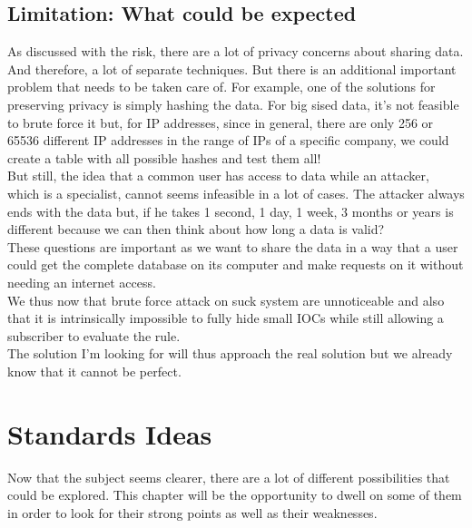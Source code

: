 \documentclass{eplmastersthesis}
\begin{document}
\section{Limitation: What could be expected}

As discussed with the risk, there are a lot of privacy concerns about sharing data. And therefore, a lot of separate techniques. But there is an additional important problem that needs to be taken care of. For example, one of the solutions for preserving privacy is simply hashing the data. For big sised data, it's not feasible to brute force it but, for IP addresses, since in general, there are only 256 or 65536 different IP addresses in the range of IPs of a specific company, we could create a table with all possible hashes and test them all!\\

But still, the idea that a common user has access to data while an attacker, which is a specialist, cannot seems infeasible in a lot of cases. The attacker always ends with the data but, if he takes 1 second, 1 day, 1 week, 3 months or years is different because we can then think about how long a data is valid? \\

These questions are important as we want to share the data in a way that a user could get the complete database on its computer and make requests on it without needing an internet access.\\
We thus now that brute force attack on suck system are unnoticeable and also that it is intrinsically impossible to fully hide small IOCs while still allowing a subscriber to evaluate the rule. \\

The solution I'm looking for will thus approach the real solution but we already know that it cannot be perfect.

\chapter{Standards Ideas}

Now that the subject seems clearer, there are a lot of different possibilities that could be explored. This chapter will be the opportunity to dwell on some of them in order to look for their strong points as well as their weaknesses.
\end{document}
